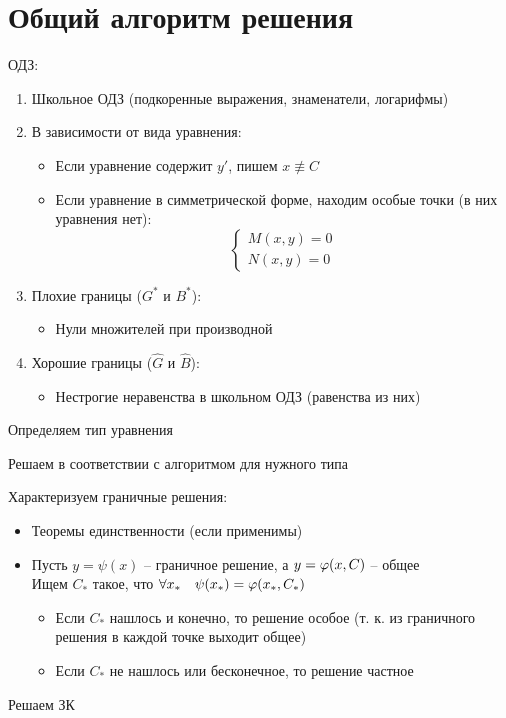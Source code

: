 \chapter{Общий алгоритм решения}

\begin{algo}
	\item ОДЗ:
    \begin{enumerate}
        \item Школьное ОДЗ (подкоренные выражения, знаменатели, логарифмы)
        \item В зависимости от вида уравнения:
        \begin{itemize}
        	\item Если уравнение содержит $ y' $, пишем $ x \not\equiv C $
            \item Если уравнение в симметрической форме, находим особые точки (в них уравнения нет):
            $$
            \begin{cases}
            	M(x, y) = 0 \\
                N(x, y) = 0
            \end{cases} $$
        \end{itemize}
        \item Плохие границы ($ G^* $ и $ B^* $):
        \begin{itemize}
        	\item Нули множителей при производной
        \end{itemize}
        \item Хорошие границы ($ \hat{G} $ и $ \hat{B} $):
        \begin{itemize}
        	\item Нестрогие неравенства в школьном ОДЗ (равенства из них)
        \end{itemize}
    \end{enumerate}
    \item Определяем тип уравнения
    \item Решаем в соответствии с алгоритмом для нужного типа
    \item Характеризуем граничные решения:
    \begin{itemize}
    	\item Теоремы единственности (если применимы)
        \item Пусть $ y = \psi(x) $ -- граничное решение, а $ y = \varphi(x, C) $ -- общее \\
        Ищем $ C_* $ такое, что $ \forall x_* \quad \psi(x_*) = \varphi(x_*, C_*) $
        \begin{itemize}
        	\item Если $ C_* $ нашлось и конечно, то решение особое (т. к. из граничного решения в каждой точке выходит общее)
            \item Если $ C_* $ не нашлось или бесконечное, то решение частное
        \end{itemize}
    \end{itemize}
    \item Решаем ЗК
\end{algo}


